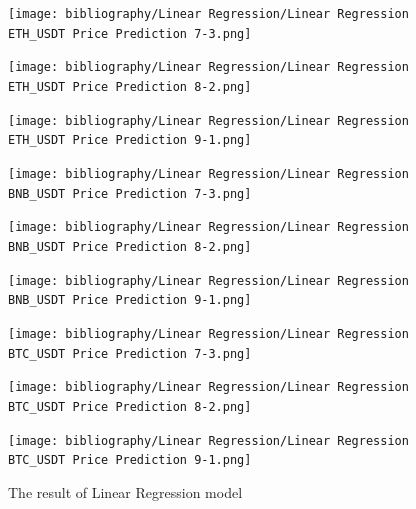\documentclass{ieeeojies}
\begin{document}
\begin{figure}[H]
    \centering
    \begin{minipage}{0.15\textwidth}
    \centering
    \texttt{[image: bibliography/Linear Regression/Linear Regression ETH\_USDT Price Prediction 7-3.png]}
    \end{minipage}
    \hfill
    \begin{minipage}{0.15\textwidth}
    \centering
    \texttt{[image: bibliography/Linear Regression/Linear Regression ETH\_USDT Price Prediction 8-2.png]}
    \end{minipage}
    \hfill
    \begin{minipage}{0.15\textwidth}
    \centering
    \texttt{[image: bibliography/Linear Regression/Linear Regression ETH\_USDT Price Prediction 9-1.png]}
    \end{minipage}
    \centering
    \begin{minipage}{0.15\textwidth}
    \centering
    \texttt{[image: bibliography/Linear Regression/Linear Regression BNB\_USDT Price Prediction 7-3.png]}
    \end{minipage}
    \hfill
    \begin{minipage}{0.15\textwidth}
    \centering
    \texttt{[image: bibliography/Linear Regression/Linear Regression BNB\_USDT Price Prediction 8-2.png]}
    \end{minipage}
    \hfill
    \begin{minipage}{0.15\textwidth}
    \centering
    \texttt{[image: bibliography/Linear Regression/Linear Regression BNB\_USDT Price Prediction 9-1.png]}
    \end{minipage}
    \centering
    \begin{minipage}{0.15\textwidth}
    \centering
    \texttt{[image: bibliography/Linear Regression/Linear Regression BTC\_USDT Price Prediction 7-3.png]}
    \end{minipage}
    \hfill
    \begin{minipage}{0.15\textwidth}
    \centering
    \texttt{[image: bibliography/Linear Regression/Linear Regression BTC\_USDT Price Prediction 8-2.png]}
    \end{minipage}
    \hfill
    \begin{minipage}{0.15\textwidth}
    \centering
    \texttt{[image: bibliography/Linear Regression/Linear Regression BTC\_USDT Price Prediction 9-1.png]}
    \end{minipage}
    \caption{The result of Linear Regression model}
    \label{fig:enter-label}
\end{figure}
\end{document}

